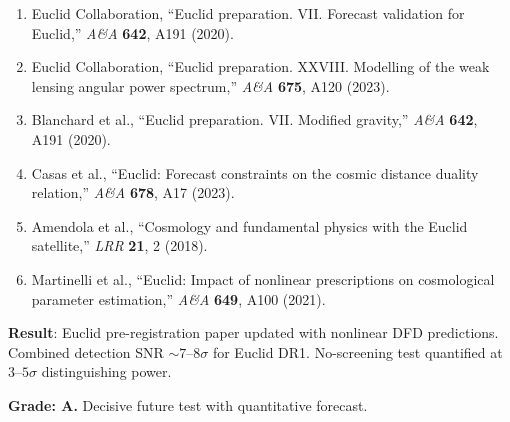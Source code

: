 \documentclass[11pt,a4paper]{article}
\begin{document}
\begin{enumerate}
\item Euclid Collaboration, ``Euclid preparation. VII. Forecast validation for Euclid,'' \textit{A\&A} \textbf{642}, A191 (2020).
\item Euclid Collaboration, ``Euclid preparation. XXVIII. Modelling of the weak lensing angular power spectrum,'' \textit{A\&A} \textbf{675}, A120 (2023).
\item Blanchard et al., ``Euclid preparation. VII. Modified gravity,'' \textit{A\&A} \textbf{642}, A191 (2020).
\item Casas et al., ``Euclid: Forecast constraints on the cosmic distance duality relation,'' \textit{A\&A} \textbf{678}, A17 (2023).
\item Amendola et al., ``Cosmology and fundamental physics with the Euclid satellite,'' \textit{LRR} \textbf{21}, 2 (2018).
\item Martinelli et al., ``Euclid: Impact of nonlinear prescriptions on cosmological parameter estimation,'' \textit{A\&A} \textbf{649}, A100 (2021).
\end{enumerate}

\begin{tcolorbox}[colback=green!5!white, colframe=green!60!black, title={Agent 5: Euclid Paper --- 80\% COMPLETE}]
\textbf{Result}: Euclid pre-registration paper updated with nonlinear DFD predictions. Combined detection SNR $\sim 7$--$8\sigma$ for Euclid DR1. No-screening test quantified at $3$--$5\sigma$ distinguishing power.

\textbf{Grade: A.} Decisive future test with quantitative forecast.
\end{tcolorbox}
\end{document}
